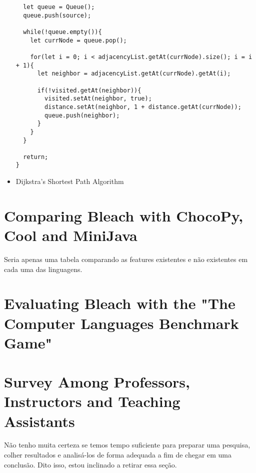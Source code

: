 \begin{itemize}
\begin{lstlisting}
  let queue = Queue();
  queue.push(source);

  while(!queue.empty()){
    let currNode = queue.pop();

    for(let i = 0; i < adjacencyList.getAt(currNode).size(); i = i + 1){
      let neighbor = adjacencyList.getAt(currNode).getAt(i);

      if(!visited.getAt(neighbor)){
        visited.setAt(neighbor, true);
        distance.setAt(neighbor, 1 + distance.getAt(currNode));
        queue.push(neighbor);
      }
    }
  }

  return;
}
        \end{lstlisting}
    \item Dijkstra's Shortest Path Algorithm
\end{itemize}

\section{Comparing Bleach with ChocoPy, Cool and MiniJava}
Seria apenas uma tabela comparando as features existentes e não existentes em cada uma das linguagens.

\section{Evaluating Bleach with the "The Computer Languages Benchmark Game"}

\section{Survey Among Professors, Instructors and Teaching Assistants}
Não tenho muita certeza se temos tempo suficiente para preparar uma pesquisa, colher resultados e analisá-los de forma adequada a fim de chegar em uma conclusão. Dito isso, estou inclinado a retirar essa seção.